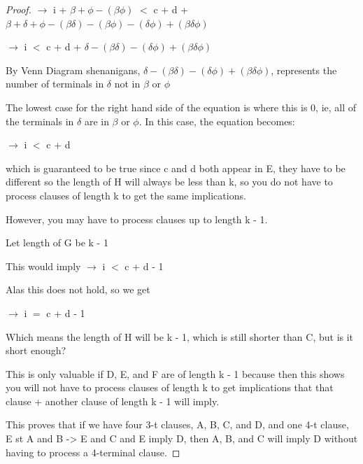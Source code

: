 \documentclass[manuscript]{acmart}
\begin{document}
\begin{proof}
        $\rightarrow$ i + $\beta + \phi - (\beta \phi)$ $<$ 
        c + d + $\beta + \delta + \phi - (\beta \delta) - 
        (\beta \phi) - (\delta \phi) + (\beta \delta \phi)$

        $\rightarrow$ i $<$ 
        c + d + $\delta - (\beta \delta) - (\delta \phi) + (\beta \delta \phi)$

        By Venn Diagram shenanigans, $\delta - (\beta \delta) - (\delta \phi) + (\beta \delta \phi)$, 
        represents the number of terminals in $\delta$ not in $\beta$ or $\phi$

        The lowest case for the right hand side of the equation is where this is 0, ie, 
        all of the terminals in $\delta$ are in $\beta$ or $\phi$. In this case, the equation becomes:

        $\rightarrow$ i $<$ c + d

        which is guaranteed to be true since c and d both appear in E, they have to be different
        so the length of H will always be less than k, so you do not have to process
        clauses of length k to get the same implications.

        However, you may have to process clauses up to length k - 1.

        Let length of G be k - 1

        This would imply $\rightarrow$ i $<$ c + d - 1

        Alas this does not hold, so we get

        $\rightarrow$ i $=$ c + d - 1

        Which means the length of H will be k - 1, which is still shorter than C, 
        but is it short enough?

        This is only valuable if D, E, and F are of length k - 1 because then 
        this shows you will not have to process clauses of length k to
        get implications that that clause + another clause of length k - 1 will
        imply.
        
        This proves that if we have four 3-t clauses, A, B, C, and D, and one
        4-t clause, E st A and B -> E and C and E imply D, then A, B, and
        C will imply D without having to process a 4-terminal clause.

    \end{proof}
\end{document}

